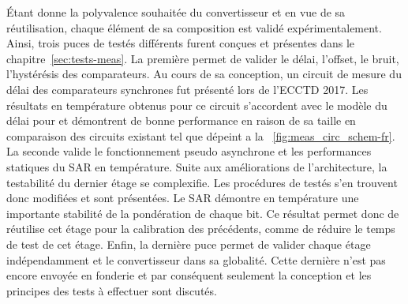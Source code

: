 \begin{mdframed}[linecolor=Prune,linewidth=1]
Étant donne la polyvalence souhaitée du convertisseur et en vue de sa réutilisation, chaque élément de sa composition est validé expérimentalement. Ainsi, trois puces de testés différents furent conçues et présentes dans le chapitre~\ref{sec:tests-meas}. La première permet de valider le délai, l'offset, le bruit, l’hystérésis des comparateurs. Au cours de sa conception, un circuit de mesure du délai des comparateurs synchrones fut présenté lors de l'ECCTD 2017. Les résultats en température obtenus pour ce circuit s'accordent avec le modèle du délai pour et démontrent de bonne performance en raison de sa taille en comparaison des circuits existant tel que dépeint a la \figurename~\ref{fig:meas_circ_schem-fr}. La seconde valide le fonctionnement pseudo asynchrone et les performances statiques du SAR en température. Suite aux améliorations de l'architecture, la testabilité du dernier étage se complexifie. Les procédures de testés s'en trouvent donc modifiées et sont présentées. Le SAR démontre en température une importante stabilité de la pondération de chaque bit. Ce résultat permet donc de réutilise cet étage pour la calibration des précédents, comme de réduire le temps de test de cet étage. Enfin, la dernière puce permet de valider chaque étage indépendamment et le convertisseur dans sa globalité. Cette dernière n'est pas encore envoyée en fonderie et par conséquent seulement la conception et les principes des tests à effectuer sont discutés.


\end{mdframed}
